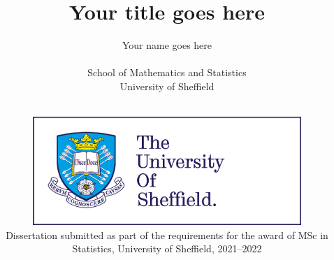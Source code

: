 


\title{Your title goes here}
\author{Your name goes here
\\$~$\vspace{0.5in}\\
School of Mathematics and Statistics\\
University of Sheffield}

\date{$~$\vspace{1.5in}\\
\includegraphics[width=4in]{figures/logo.jpg}\\
\vfill Dissertation submitted as part of the requirements for the award of MSc in Statistics, University of Sheffield, 2021--2022\\
}

\maketitle
